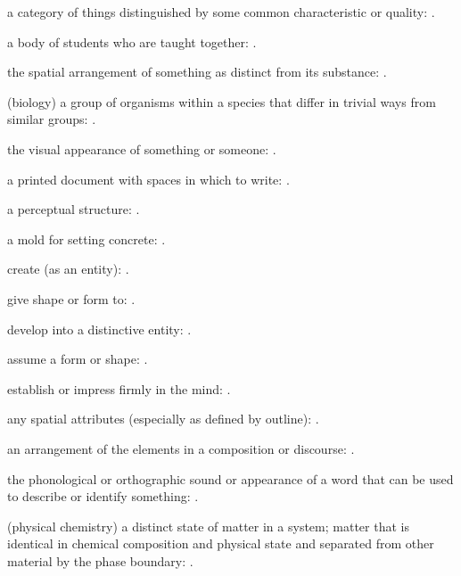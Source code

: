   a category of things distinguished by some common characteristic or quality:   .

  a body of students who are taught together:   .

  the spatial arrangement of something as distinct from its substance:   .

  (biology) a group of organisms within a species that differ in trivial ways from similar groups:   .

  the visual appearance of something or someone:   .

  a printed document with spaces in which to write: .

  a perceptual structure:   .

  a mold for setting concrete: .

  create (as an entity):   .

  give shape or form to:   .

  develop into a distinctive entity:   .

  assume a form or shape: .

  establish or impress firmly in the mind:   .

  any spatial attributes (especially as defined by outline):   .

  an arrangement of the elements in a composition or discourse: .

  the phonological or orthographic sound or appearance of a word that can be used to describe or identify something:   .

  (physical chemistry) a distinct state of matter in a system; matter that is identical in chemical composition and physical state and separated from other material by the phase boundary:   .

